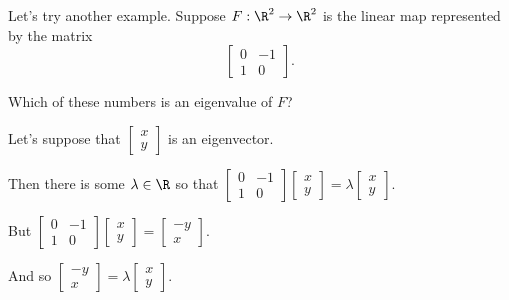 \documentclass{ximera}
\begin{document}
\begin{question}
  Let's try another example.  Suppose $F : \R^2 \to \R^2$ is the linear map represented by the matrix
  $$
  \begin{bmatrix}
    0 & -1 \\
    1 & 0
  \end{bmatrix}.
  $$

  Which of these numbers is an eigenvalue of $F$?
  \begin{solution}
    \begin{hint}
      Let's suppose that $\begin{bmatrix} x \\ y \end{bmatrix}$ is an eigenvector.
    \end{hint}

    \begin{hint}
      Then there is some $\lambda \in \R$ so that $\begin{bmatrix}
    0 & -1 \\
    1 & 0
  \end{bmatrix} \begin{bmatrix} x \\ y \end{bmatrix} = \lambda \begin{bmatrix} x \\ y \end{bmatrix}$.
    \end{hint}

    \begin{hint}
      But $\begin{bmatrix}
    0 & -1 \\
    1 & 0
  \end{bmatrix} \begin{bmatrix} x \\ y \end{bmatrix} = \begin{bmatrix} -y \\ x \end{bmatrix}$.
    \end{hint}

    \begin{hint}
      And so $\begin{bmatrix} -y \\ x \end{bmatrix} = \lambda \begin{bmatrix} x \\ y \end{bmatrix}$.
    \end{hint}


\end{solution}
\end{question}
\end{document}
